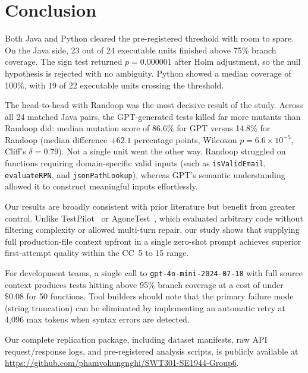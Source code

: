 \section{Conclusion}
\label{sec:conclusion}

Both Java and Python cleared the pre-registered threshold with room to spare. On the Java side, 23 out of 24 executable units finished above 75\% branch coverage. The sign test returned $p = 0.000001$ after Holm adjustment, so the null hypothesis is rejected with no ambiguity. Python showed a median coverage of 100\%, with 19 of 22 executable units crossing the threshold.

The head-to-head with Randoop was the most decisive result of the study. Across all 24 matched Java pairs, the GPT-generated tests killed far more mutants than Randoop did: median mutation score of 86.6\% for GPT versus 14.8\% for Randoop (median difference $+62.1$ percentage points, Wilcoxon $p = 6.6 \times 10^{-5}$, Cliff's $\delta = 0.79$). Not a single unit went the other way. Randoop struggled on functions requiring domain-specific valid inputs (such as \texttt{isValidEmail}, \texttt{evaluateRPN}, and \texttt{jsonPathLookup}), whereas GPT's semantic understanding allowed it to construct meaningful inputs effortlessly.

Our results are broadly consistent with prior literature but benefit from greater control. Unlike TestPilot~\cite{schafer2024testpilot} or AgoneTest~\cite{lops2025agonetest}, which evaluated arbitrary code without filtering complexity or allowed multi-turn repair, our study shows that supplying full production-file context upfront in a single zero-shot prompt achieves superior first-attempt quality within the CC~5 to 15 range.

For development teams, a single call to \texttt{gpt-4o-mini-2024-07-18} with full source context produces tests hitting above 95\% branch coverage at a cost of under \$0.08 for 50 functions. Tool builders should note that the primary failure mode (string truncation) can be eliminated by implementing an automatic retry at 4,096 max tokens when syntax errors are detected.

Our complete replication package, including dataset manifests, raw API request/response logs, and pre-registered analysis scripts, is publicly available at \url{https://github.com/phamvohungnghi/SWT301-SE1944-Group6}.
